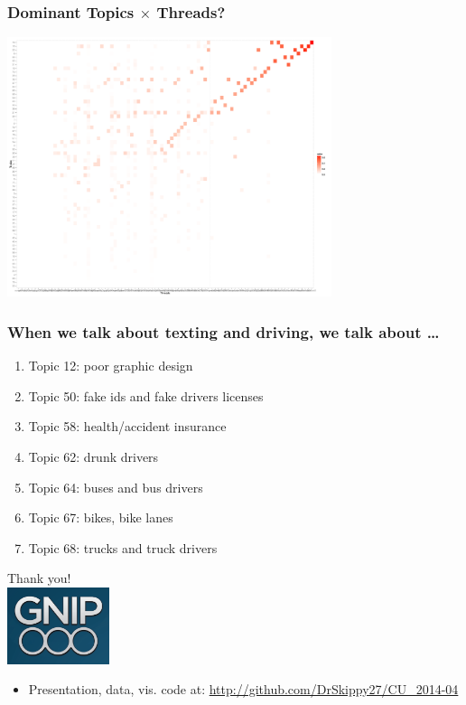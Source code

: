 \documentclass{beamer}
\begin{document}
\begin{frame}\frametitle{Dominant Topics $\times$ Threads?}
  \begin{center}
    \includegraphics[width=9.5cm]{./imgs/gg_heat.pdf}
  \end{center}
\end{frame}

\begin{frame}\frametitle{When we talk about texting and driving, we talk about \ldots}
\begin{center}
{\Large 
\begin{enumerate}
\item Topic 12: poor graphic design
\item Topic 50: fake ids and fake drivers licenses
\item Topic 58: health/accident insurance
\item Topic 62: drunk drivers
\item Topic 64: buses and bus drivers
\item Topic 67: bikes, bike lanes
\item Topic 68: trucks and truck drivers
\end{enumerate}
}
\end{center}
\end{frame}

\begin{frame}
  \begin{center}
    {\Large Thank you!}  \\ [20pt]
    \includegraphics[width=3cm]{./imgs/logo.png} \\ [15pt]
    \begin{itemize}
    \item Presentation, data, vis. code at: \url{http://github.com/DrSkippy27/CU_2014-04}
    \end{itemize}
  \end{center}
\end{frame}
\end{document}
